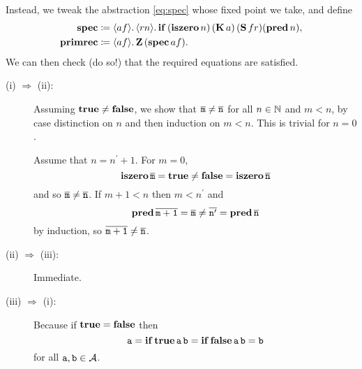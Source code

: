 Instead, we tweak the abstraction \eqref{eq:spec} whose fixed point we take,
and define
\begin{align*}
\spec & \defeq
\lambdapca{af}{\lambdapca{rn}{
  \pcaif \, (\pcaiszero n) \, (\kcomb a) \, (\scomb f r)
    (\pcapred n)
}}, \\
\pcarec & \defeq \lambdapca{af}{\pcaz \, (\spec a f)}.
\end{align*}
We can then check (do so!) that the required equations are satisfied.




\begin{description}

\item[(i) \(\Longrightarrow\) (ii):]
  Assuming \(\pcatrue \neq \pcafalse\), we show that
  \(\numeral{m} \neq \numeral{n}\) for all \(n \in \Nat\) and \(m < n\),
  by case distinction on \(n\) and then induction on \(m < n\).
  This is trivial for \(n = 0\).

  Assume that \(n = n^\prime + 1\).
  For \(m = 0\),
  \[ \pcaiszero \numeral{m} = \pcatrue \neq \pcafalse = \pcaiszero \numeral{n} \]
  and so \(\numeral m \neq \numeral n\).
  If \(m+1 < n\) then \(m < n^\prime\) and
  \[ \pcapred \numeral{m+1} = \numeral m
    \neq \numeral{n^\prime} = \pcapred \numeral{n} \]
  by induction, so \(\numeral{m+1} \neq \numeral n\).

\item[(ii) \(\Longrightarrow\) (iii):]
  Immediate.

\item[(iii) \(\Longrightarrow\) (i):]
  Because if \(\pcatrue = \pcafalse\) then
  \[ \pca a = \pcaif \pcatrue \pca{a} \pca{b} =
    \pcaif \pcafalse \pca{a} \pca{b} = \pca b \]
  for all \(\pca a, \pca b \in \AA\).

\end{description}